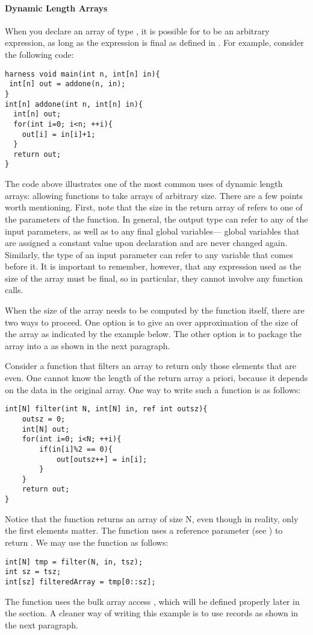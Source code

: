 \paragraph{Dynamic Length Arrays}

When you declare an array of type , it is possible for  to be an arbitrary expression, as long as the expression is final as defined in . For example, consider the following code:
\begin{lstlisting}
harness void main(int n, int[n] in){
 int[n] out = addone(n, in);
}
int[n] addone(int n, int[n] in){
  int[n] out;
  for(int i=0; i<n; ++i){
    out[i] = in[i]+1;
  }
  return out;
}
\end{lstlisting}

The code above illustrates one of the most common uses of dynamic length arrays: allowing functions to take arrays of arbitrary size. There are a few points worth mentioning. First, note that the size in the return array of  refers to one of the parameters of the function. In general, the output type can refer to any of the input parameters, as well as to any final global variables---\ie{} global variables that are assigned a constant value upon declaration and are never changed again. Similarly, the type of an input parameter can refer to any variable that comes before it. It is important to remember, however, that any expression used as the size of the array must be final, so in particular, they cannot involve any function calls.

When the size of the array needs to be computed by the function itself, there are two ways to proceed. One option is to give an over approximation of the size of the array as indicated by the example below. The other option is to package the array into a  as shown in the next paragraph.

\begin{Example}
Consider a function that filters an array to return only those elements that are even. One cannot know the length of the return array a priori, because it depends on the data in the original array. One way to write such a function is as follows:
\begin{lstlisting}
int[N] filter(int N, int[N] in, ref int outsz){
	outsz = 0;
	int[N] out;
	for(int i=0; i<N; ++i){ 
		if(in[i]%2 == 0){
			out[outsz++] = in[i];			
		}
	}
	return out;
}
\end{lstlisting}
Notice that the function returns an array of size N, even though in reality, only the first  elements matter. The function uses a reference parameter (see ) to return .
We may use the function as follows:
\begin{lstlisting}
int[N] tmp = filter(N, in, tsz);
int sz = tsz;
int[sz] filteredArray = tmp[0::sz];
\end{lstlisting}
The function uses the bulk array access , which will be defined properly later in the section. A cleaner way of writing this example is to use records as shown in the next paragraph.
\end{Example}

